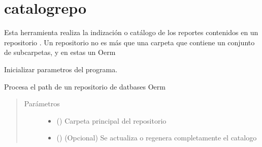 \documentclass[a4paper,12pt,spanish]{sphinxmanual}
\begin{document}
\label{\detokenize{catalogrepo:catalogrepo}}\label{\detokenize{catalogrepo:module-catalogrepo}}\label{\detokenize{catalogrepo:catalogrepo}}

\section{catalogrepo}
\label{\detokenize{catalogrepo:id1}}\label{\detokenize{catalogrepo::doc}}
Esta herramienta realiza la indización o catálogo de los reportes
contenidos en un repositorio . Un repositorio no es más
que una carpeta que contiene un conjunto de subcarpetas, y en estas
un  Oerm

\begin{fulllineitems}
\label{\detokenize{catalogrepo:catalogrepo.init_argparse}}
Inicializar parametros del programa.

\end{fulllineitems}


\begin{fulllineitems}
\label{\detokenize{catalogrepo:catalogrepo.procces_tree}}
Procesa el path de un repositorio de datbases Oerm
\begin{quote}\begin{description}
\item[{Parámetros}] \leavevmode\begin{itemize}
\item {} 
 () \textendash{} Carpeta principal del repositorio

\item {} 
 () \textendash{} (Opcional) Se actualiza o regenera completamente el catalogo

\end{itemize}

\end{description}\end{quote}

\end{fulllineitems}
\end{document}

